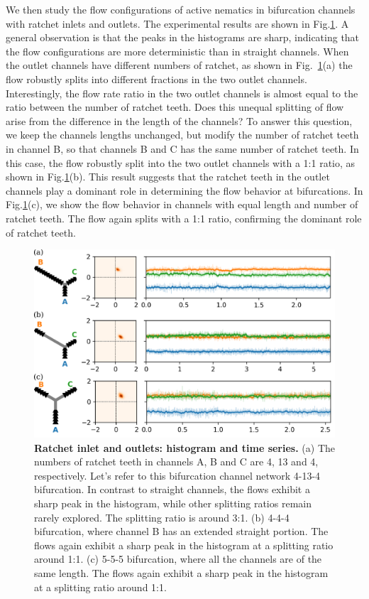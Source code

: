 \documentclass[%
10pt,
superscriptaddress,
twocolumn,
 amsmath,amssymb,
 aps,prx,
]{revtex4-2}
\begin{document}
We then study the flow configurations of active nematics in bifurcation channels with ratchet inlets and outlets.
The experimental results are shown in Fig.\ref{fig:ratchet-dominance}.
A general observation is that the peaks in the histograms are sharp, indicating that the flow configurations are more deterministic than in straight channels.
When the outlet channels have different numbers of ratchet, as shown in Fig.~\ref{fig:ratchet-dominance}(a) the flow robustly splits into different fractions in the two outlet channels.
Interestingly, the flow rate ratio in the two outlet channels is almost equal to the ratio between the number of ratchet teeth.
Does this unequal splitting of flow arise from the difference in the length of the channels?
To answer this question, we keep the channels lengths unchanged, but modify the number of ratchet teeth in channel B, so that channels B and C has the same number of ratchet teeth.
In this case, the flow robustly split into the two outlet channels with a 1:1 ratio, as shown in Fig.\ref{fig:ratchet-dominance}(b).
This result suggests that the ratchet teeth in the outlet channels play a dominant role in determining the flow behavior at bifurcations.
In Fig.\ref{fig:ratchet-dominance}(c), we show the flow behavior in channels with equal length and number of ratchet teeth.
The flow again splits with a 1:1 ratio, confirming the dominant role of ratchet teeth.

\begin{figure}[!h]
    \includegraphics[width=\textwidth]{5-ratchet-dominance}
    \caption{
    \textbf{Ratchet inlet and outlets: histogram and time series.}
    (a) The numbers of ratchet teeth in channels A, B and C are 4, 13 and 4, respectively. 
    Let's refer to this bifurcation channel network 4-13-4 bifurcation. 
    In contrast to straight channels, the flows exhibit a sharp peak in the histogram, while other splitting ratios remain rarely explored. 
    The splitting ratio is around 3:1.
    (b) 4-4-4 bifurcation, where channel B has an extended straight portion. 
    The flows again exhibit a sharp peak in the histogram at a splitting ratio around 1:1.
    (c) 5-5-5 bifurcation, where all the channels are of the same length. 
    The flows again exhibit a sharp peak in the histogram at a splitting ratio around 1:1.
    }
    \label{fig:ratchet-dominance}
\end{figure}
\end{document}
